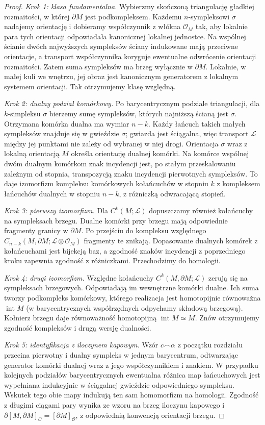 \documentclass[11pt,a4paper,oneside]{report}
\theoremstyle{plain}
\theoremstyle{definition}
\theoremstyle{remark}
\begin{document}
\begin{proof}
\emph{Krok 1: klasa fundamentalna.}
Wybierzmy skończoną triangulację gładkiej rozmaitości,
w której $\partial M$ jest podkompleksem. Każdemu
$n$-sympleksowi $\sigma$ nadajemy orientację i dobieramy
współczynnik z włókna $\mathcal O_M$ tak, aby lokalnie
para tych orientacji odpowiadała kanonicznej lokalnej
jednostce. Na wspólnej ścianie dwóch najwyższych
sympleksów ściany indukowane mają przeciwne orientacje,
a transport współczynnika koryguje ewentualne odwrócenie
orientacji rozmaitości. Zatem suma sympleksów ma brzeg
wyłącznie w $\partial M$. Lokalnie, w małej kuli we wnętrzu,
jej obraz jest kanonicznym generatorem z lokalnym
systemem orientacji. Tak otrzymujemy klasę względną.

\emph{Krok 2: dualny podział komórkowy.}
Po barycentrycznym podziale triangulacji, dla $k$-simpleksu
$\sigma$ bierzemy sumę sympleksów, których najniższą
ścianą jest $\sigma$. Otrzymana komórka dualna ma wymiar
$n-k$. Każdy łańcuch takich małych sympleksów znajduje się
w gwieździe $\sigma$; gwiazda jest ściągalna, więc
transport $\mathcal L$ między jej punktami nie zależy od
wybranej w niej drogi. Orientacja $\sigma$ wraz z lokalną
orientacją $M$ określa orientację dualnej komórki.
Na komórce wspólnej dwóm dualnym komórkom znak incydencji
jest, po stałym przeskalowaniu zależnym od stopnia,
transpozycją znaku incydencji pierwotnych sympleksów.
To daje izomorfizm kompleksu komórkowych kołańcuchów
w stopniu $k$ z kompleksem łańcuchów dualnych w stopniu
$n-k$, z różniczką odwracającą stopień.

\emph{Krok 3: pierwszy izomorfizm.}
Dla $C^k(M;\mathcal L)$ dopuszczamy również kołańcuchy
na sympleksach brzegu. Dualne komórki przy brzegu mają
odpowiednie fragmenty granicy w $\partial M$.
Po przejściu do kompleksu względnego
$C_{n-k}(M,\partial M;\mathcal L\otimes\mathcal O_M)$
fragmenty te znikają. Dopasowanie dualnych komórek
z kołańcuchami jest bijekcją baz, a zgodność znaków
incydencji z poprzedniego kroku zapewnia zgodność z
różniczkami. Przechodzimy do homologii.

\emph{Krok 4: drugi izomorfizm.}
Względne kołańcuchy $C^k(M,\partial M;\mathcal L)$
zerują się na sympleksach brzegowych. Odpowiadają im
wewnętrzne komórki dualne. Ich suma tworzy podkompleks
komórkowy, którego realizacja jest homotopijnie równoważna
$\operatorname{int}M$ (w barycentrycznych współrzędnych
odpychamy składową brzegową). Kołnierz brzegu daje
równoważność homotopijną $\operatorname{int}M\simeq M$.
Znów otrzymujemy zgodność kompleksów i drugą wersję dualności.

\emph{Krok 5: identyfikacja z iloczynem kapowym.}
Wzór $c\frown\alpha$ z początku rozdziału przecina
pierwotny i dualny sympleks w jednym barycentrum,
odtwarzając generator komórki dualnej wraz z jego
współczynnikiem i znakiem. W przypadku kolejnych podziałów
barycentrycznych ewentualna różnica map łańcuchowych
jest wypełniana indukcyjnie w ściągalnej gwieździe
odpowiedniego sympleksu. Wskutek tego obie mapy
indukują ten sam homomorfizm na homologii.
Zgodność z długimi ciągami pary wynika ze wzoru na
brzeg iloczynu kapowego i
$\partial[M,\partial M]_{\mathcal O}=[\partial M]_{\mathcal O}$,
z odpowiednią konwencją orientacji brzegu.
\end{proof}
\end{document}
